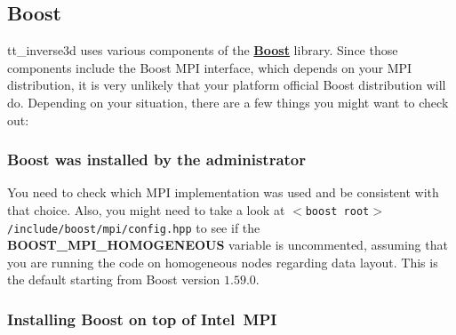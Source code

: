 \documentclass[twoside,final,onecolumn]{article}
\newcommand{\intel}{Intel\textregistered}
\newcommand{\Boost}{\textbf{Boost}}
\begin{document}
\subsection{Boost}

tt\_inverse3d uses various components of the \href{http://www.boost.org}{\Boost} library. Since those components include the Boost MPI interface,
which depends on your MPI distribution, it is very unlikely that your platform official Boost distribution will do. 
Depending on your situation, there are a few things you might want to check out:

\subsubsection{Boost was installed by the administrator}

You need to check which MPI implementation was used and be consistent with that choice. Also, you might need to take a look at \texttt{$<$boost root$>$/include/boost/mpi/config.hpp} to see if the \textbf{BOOST\_MPI\_HOMOGENEOUS} variable is uncommented,
assuming that you are running the code on homogeneous nodes regarding data layout. This is the default starting from Boost version $1.59.0$.

\subsubsection{Installing Boost on top of \intel\ MPI}
\end{document}
